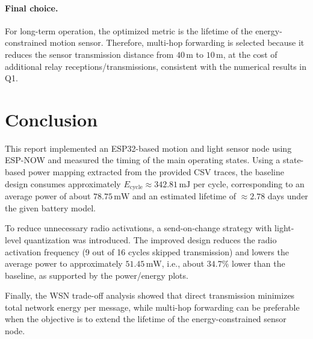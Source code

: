 \documentclass{article}
\begin{document}
\paragraph{Final choice.}
For long-term operation, the optimized metric is the lifetime of the energy-constrained motion sensor.
Therefore, multi-hop forwarding is selected because it reduces the sensor transmission distance from \(40\,\mathrm{m}\) to \(10\,\mathrm{m}\),
at the cost of additional relay receptions/transmissions, consistent with the numerical results in Q1.

\section{Conclusion}

This report implemented an ESP32-based motion and light sensor node using ESP-NOW and measured the timing of the main operating states.
Using a state-based power mapping extracted from the provided CSV traces, the baseline design consumes approximately
\(E_{\mathrm{cycle}}\approx 342.81\,\mathrm{mJ}\) per cycle, corresponding to an average power of about \(78.75\,\mathrm{mW}\)
and an estimated lifetime of \(\approx 2.78\) days under the given battery model.

To reduce unnecessary radio activations, a send-on-change strategy with light-level quantization was introduced.
The improved design reduces the radio activation frequency (9 out of 16 cycles skipped transmission) and lowers the average power
to approximately \(51.45\,\mathrm{mW}\), i.e., about \(34.7\%\) lower than the baseline, as supported by the power/energy plots.

Finally, the WSN trade-off analysis showed that direct transmission minimizes total network energy per message, while multi-hop forwarding
can be preferable when the objective is to extend the lifetime of the energy-constrained sensor node.
\end{document}
